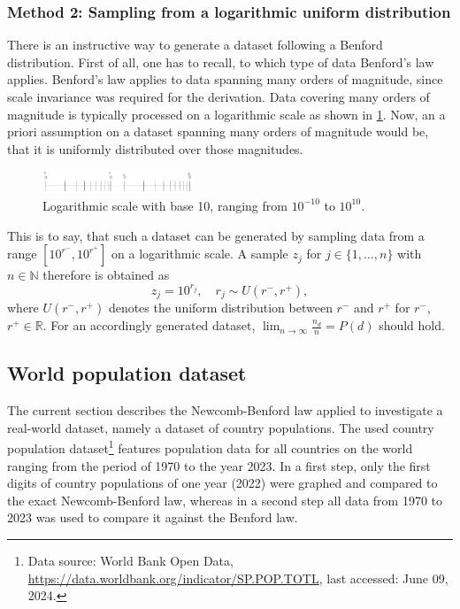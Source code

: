 \documentclass[a4paper,11pt, twocolumn]{article}
\begin{document}
\subsubsection{Method 2: Sampling from a logarithmic uniform distribution}
There is an instructive way to generate a dataset following a Benford distribution. First of all, one has to recall, to which type of data Benford's law applies. Benford's law applies to data spanning many orders of magnitude, since scale invariance was required for the derivation. Data covering many orders of magnitude is typically processed on a logarithmic scale as shown in \cref{fig:logarithmicscale}. Now, an a priori assumption on a dataset spanning many orders of magnitude would be, that it is uniformly distributed over those magnitudes.
\begin{figure}[h]
	\centering
	\includegraphics[width=0.4\textwidth]{figures/logarithmicscale.pdf}
	\caption{Logarithmic scale with base 10, ranging from $10^{-10}$ to $10^{10}$.}
	\label{fig:logarithmicscale}
\end{figure}
This is to say, that such a dataset can be generated by sampling data from a range $[10^{r^-}, 10^{r^+}]$ on a logarithmic scale. A sample $z_j$ for $j \in \{1,\dots,n\}$ with $n \in \mathbb{N}$ therefore is obtained as \begin{equation}\label{eq:gensamples}
	z_j = 10^{r_j}, \quad r_j \sim U(r^-,r^+),
\end{equation} where $U(r^-,r^+)$ denotes the uniform distribution between $r
^-$ and $r^+$ for $r^-$, $r^+ \in \mathbb{R}$. For an accordingly generated dataset, $\lim_{n\rightarrow \infty} \frac{n_d}{n} = P(d)$ should hold.

\subsection{World population dataset}
The current section describes the Newcomb-Benford law applied to investigate a real-world dataset, namely a dataset of country populations. The used country population dataset\footnote{Data source: World Bank Open Data, \url{https://data.worldbank.org/indicator/SP.POP.TOTL}, last accessed: June 09, 2024.} features population data for all countries on the world ranging from the period of 1970 to the year 2023. In a first step, only the first digits of country populations of one year (2022) were graphed and compared to the exact Newcomb-Benford law, whereas in a second step all data from 1970 to 2023 was used to compare it against the Benford law.
\end{document}
